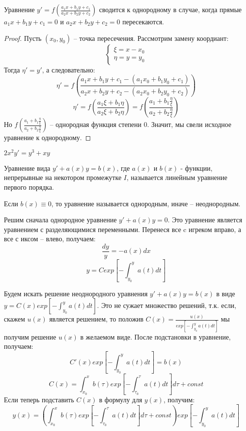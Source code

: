 \documentclass[document.tex]{subfiles}
\begin{document}
\begin{statement}
Уравнение $y' = f(\frac{a_1x+b_1y+c_1}{a_2x+b_2y+c_2})$ сводится к однородному в случае, когда прямые $a_1x+b_1y+c_1 = 0$ и $a_2x+b_2y+c_2 = 0$ пересекаются.
\end{statement}
\begin{proof}
Пусть $(x_0, y_0)$ -- точка пересечения.
Рассмотрим замену коордиант:
$$\begin{cases}
\xi = x - x_0 \\
\eta = y = y_0
\end{cases}$$
Тогда $\eta' = y'$, а следовательно:
$$\eta' = f(\frac{a_1x+b_1y+c_1 - (a_1x_0 + b_1y_0 + c_1)}{a_2x+b_2y+c_2 - (a_2x_0 + b_2y_0 + c_2)})$$
$$\eta' = f(\frac{a_1\xi+b_1\eta}{a_2\xi+b_2\eta}) = f(\frac{a_1+b_1\frac{\eta}{\xi}}{a_2+b_2\frac{\eta}{\xi}})$$
Но $f(\frac{a_1+b_1\frac{\eta}{\xi}}{a_2+b_2\frac{\eta}{\xi}})$ -- однородная функция степени 0. Значит, мы свели исходное уравнение к однородному.
\end{proof}
\begin{example}
$2x^2y' = y^3 + xy$
\end{example}
\begin{definition}
Уравнение вида $y' + a(x)y = b(x)$, где $a(x)$ и $b(x)$ - функции, непрерывные на некотором промежутке $I$, называется линейным уравнение первого порядка.

Если $b(x) \equiv 0$, то уравнение называется однородным, иначе -- неоднородным.
\end{definition}
\begin{remark}
Решим сначала однородное уравнение $y' + a(x)y = 0$. Это уравнение является уравнением с разделяющимися переменными. Перенеся все c игреком вправо, а все с иксом -- влево, получаем:
$$\frac{dy}{y} = -a(x)dx$$
$$y = Cexp\left[-\int^{y}_{y_0}a(t)dt\right]$$

Будем искать решение неоднородного уравнения $y' + a(x)y = b(x)$ в виде $y = C(x)exp\left[-\int^{y}_{y_0}a(t)dt\right]$. Это не сужает множество решений, т.к. если, скажем $u(x)$ является решением, то положив $C(x) = \frac{u(x)}{exp\left[-\int^{y}_{y_0}a(t)dt\right]}$ мы получим решение $u(x)$ в желаемом виде. После подстановки в уравнение, получаем:
$$C'(x)exp\left[-\int^{y}_{y_0}a(t)dt\right] = b(x)$$
$$C(x) = \int_{x_0}^{x}b(\tau)exp\left[-\int^{\tau}_{\tau_0}a(t)dt\right]d\tau + const$$
Если теперь подставить $C(x)$ в формулу для $y(x)$, получим:
$$y(x) = \left( \int_{x_0}^{x}b(\tau)exp\left[-\int^{\tau}_{\tau_0}a(t)dt\right]d\tau + const\right)exp\left[-\int^{y}_{y_0}a(t)dt\right]$$
\end{remark}
\end{document}
